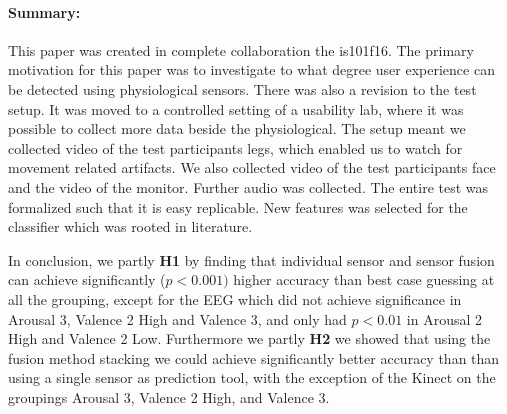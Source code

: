 \paragraph{Summary:}

This paper was created in complete collaboration the is101f16.
The primary motivation for this paper was to investigate to what degree user experience can be detected using physiological sensors.
There was also a revision to the test setup. It was moved to a controlled setting of a usability lab, where it was possible to collect more data beside the physiological.
The setup meant we collected video of the test participants legs, which enabled us to watch for movement related artifacts. We also collected video of the test participants face and the video of the monitor. 
Further audio was collected. 
The entire test was formalized such that it is easy replicable.
New features was selected for the classifier which was rooted in literature.

In conclusion, we partly \textbf{H1} by finding that individual sensor and sensor fusion can achieve significantly ($p < 0.001)$ higher accuracy than best case guessing at all the grouping, except for the EEG which did not achieve significance in Arousal 3, Valence 2 High and Valence 3, and only had $p < 0.01$ in Arousal 2 High and Valence 2 Low.
Furthermore we partly \textbf{H2} we showed that using the fusion method stacking we could achieve significantly better accuracy than than using a single sensor as prediction tool, with the exception of the Kinect on the groupings Arousal 3, Valence 2 High, and Valence 3.

